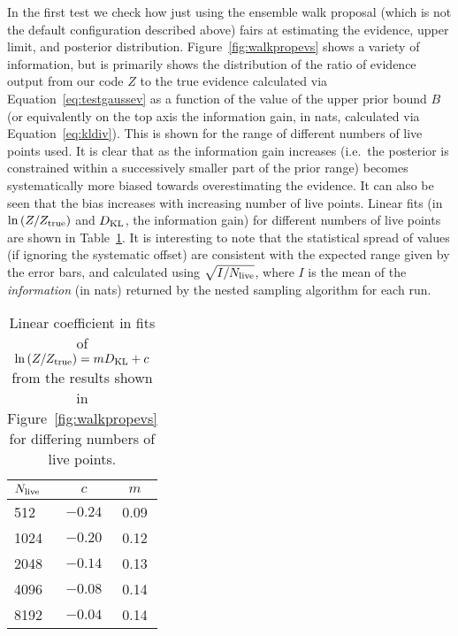 In the first test we check how just using the ensemble walk proposal (which is not the default configuration described above) fairs at
estimating the evidence, upper limit, and posterior distribution. Figure~\ref{fig:walkpropevs} shows a variety of information, but is
primarily shows the distribution of the ratio of evidence output from our code $Z$ to the true evidence calculated via
Equation~\ref{eq:testgaussev} as a function of the value of the upper prior bound $B$ (or equivalently on the top axis the
information gain, in nats, calculated via Equation~\ref{eq:kldiv}). This is shown for the range of different numbers of live points used.
It is clear that as the information gain increases (i.e.\ the posterior is constrained within a successively smaller part of the
prior range) becomes systematically more biased towards overestimating the evidence. It can also be seen that the bias increases with
increasing number of live points. Linear fits (in $\ln{(Z/Z_{\rm true})}$ and $D_{\rm KL}$, the information gain) for different numbers
of live points are shown in Table~\ref{tab:klvsz}. It is interesting to note that the statistical spread of values (if ignoring the
systematic offset) are consistent with the expected range given by the error bars, and calculated using $\sqrt{I/N_{\rm live}}$, where
$I$ is the mean of the {\it information} (in nats) returned by the nested sampling algorithm for each run.

\begin{table}[h]
\caption{Linear coefficient in fits of $\ln{(Z/Z_{\rm true})} = mD_{\rm KL} + c$ from the results
shown in Figure~\ref{fig:walkpropevs} for differing numbers of live points.\label{tab:klvsz}}
\begin{tabular}{l c c}
\hline
$N_{\rm live}$ & $c$ & $m$ \\
\hline
512 & $-0.24$ & 0.09 \\
1024 & $-0.20$ & 0.12 \\
2048 & $-0.14$ & 0.13 \\
4096 & $-0.08$ & 0.14 \\
8192 & $-0.04$ & 0.14 \\
\hline
\end{tabular}
\end{table}

